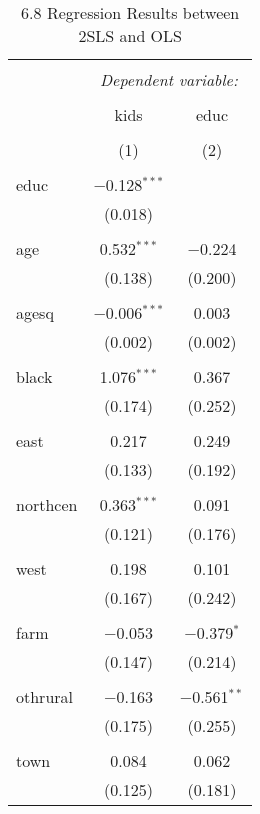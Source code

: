 \documentclass[11pt]{article} %
\begin{document}
  \begin{table}[!htbp] \centering 
    \caption{6.8 Regression Results between 2SLS and OLS} 
    \label{} 
  \begin{tabular}{@{\extracolsep{5pt}}lcc} 
  \\[-1.8ex]\hline 
  \hline \\[-1.8ex] 
   & \multicolumn{2}{c}{\textit{Dependent variable:}} \\ 
  \cline{2-3} 
  \\[-1.8ex] & kids & educ \\ 
  \\[-1.8ex] & (1) & (2)\\ 
  \hline \\[-1.8ex] 
   educ & $-$0.128$^{***}$ &  \\ 
    & (0.018) &  \\ 
    & & \\ 
   age & 0.532$^{***}$ & $-$0.224 \\ 
    & (0.138) & (0.200) \\ 
    & & \\ 
   agesq & $-$0.006$^{***}$ & 0.003 \\ 
    & (0.002) & (0.002) \\ 
    & & \\ 
   black & 1.076$^{***}$ & 0.367 \\ 
    & (0.174) & (0.252) \\ 
    & & \\ 
   east & 0.217 & 0.249 \\ 
    & (0.133) & (0.192) \\ 
    & & \\ 
   northcen & 0.363$^{***}$ & 0.091 \\ 
    & (0.121) & (0.176) \\ 
    & & \\ 
   west & 0.198 & 0.101 \\ 
    & (0.167) & (0.242) \\ 
    & & \\ 
   farm & $-$0.053 & $-$0.379$^{*}$ \\ 
    & (0.147) & (0.214) \\ 
    & & \\ 
   othrural & $-$0.163 & $-$0.561$^{**}$ \\ 
    & (0.175) & (0.255) \\ 
    & & \\ 
   town & 0.084 & 0.062 \\ 
    & (0.125) & (0.181) \\ 

\end{tabular}
\end{table}
\end{document}
